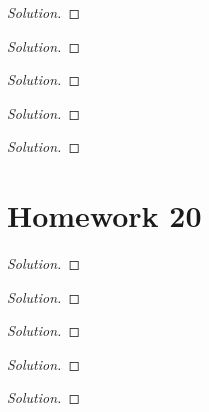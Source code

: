 \begin{problem}
\end{problem}
\begin{proof}[Solution]
\end{proof}

\begin{problem}
\end{problem}
\begin{proof}[Solution]
\end{proof}

\begin{problem}
\end{problem}
\begin{proof}[Solution]
\end{proof}

\begin{problem}
\end{problem}
\begin{proof}[Solution]
\end{proof}

\begin{problem}
\end{problem}
\begin{proof}[Solution]
\end{proof}


\section{Homework 20}
\begin{problem}
\end{problem}
\begin{proof}[Solution]
\end{proof}

\begin{problem}
\end{problem}
\begin{proof}[Solution]
\end{proof}

\begin{problem}
\end{problem}
\begin{proof}[Solution]
\end{proof}

\begin{problem}
\end{problem}
\begin{proof}[Solution]
\end{proof}

\begin{problem}
\end{problem}
\begin{proof}[Solution]
\end{proof}

